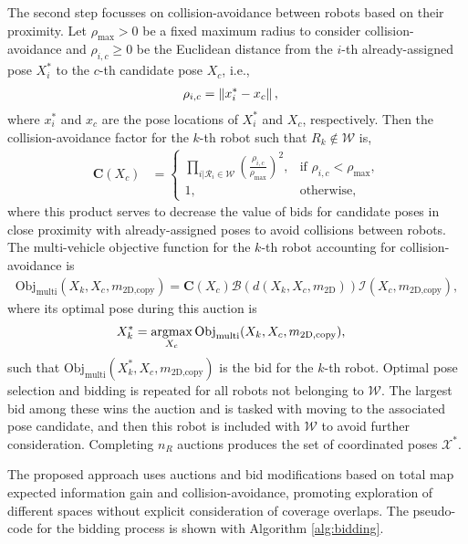 The second step focusses on collision-avoidance between robots based on their proximity. Let $\rho_\text{max}>0$ be a fixed maximum radius to consider collision-avoidance and $\rho_{i,c}\geq0$ be the Euclidean distance from the $i$-th already-assigned pose $X^*_i$ to the $c$-th candidate pose $X_c$, i.e.,
\begin{align}
\rho_{i,c}&=\left\| x^*_i-x_c \right\|,
\end{align}
where $x^*_i$ and $x_c$ are the pose locations of $X^*_i$ and $X_c$, respectively. Then the collision-avoidance factor for the $k$-th robot such that $R_k\notin\mathcal W$ is,
\begin{align}
\label{eqn:CollisionAvoidanceAmongRobots}
\mathbf C(X_c)&=
\begin{cases}
    \prod_{i|\mathcal{R}_i\in\mathcal W} \left(\frac{\rho_{i,c}}{\rho_\text{max}}\right)^2,		& \text{if }\rho_{i,c}<\rho_\text{max},\\
    1,              				& \text{otherwise},
\end{cases}
\end{align}
where this product serves to decrease the value of bids for candidate poses in close proximity with already-assigned poses to avoid collisions between robots. The multi-vehicle objective function for the $k$-th robot accounting for collision-avoidance is
\begin{align}
\label{eqn:CandidateBidMulti}
\text{Obj}_\text{multi}(X_k,X_c,m_\text{2D,copy})
=\mathbf C(X_c)\mathcal B(d(X_k,X_c,m_\text{2D}))\mathcal I(X_{c},m_\text{2D,copy}),
\end{align}
where its optimal pose during this auction is
\begin{align}
\label{eqn:OptPoseMulti}
X^*_{k}=\argmax_{X_c}\text{Obj}_\text{multi}&(X_k,X_c,m_\text{2D,copy}),
\end{align}
such that $\text{Obj}_\text{multi}(X^*_k,X_c,m_\text{2D,copy})$ is the bid for the $k$-th robot.
Optimal pose selection and bidding is repeated for all robots not belonging to $\mathcal W$. The largest bid among these wins the auction and is tasked with moving to the associated pose candidate, and then this robot is included with $\mathcal W$ to avoid further consideration. Completing $n_R$ auctions produces the set of coordinated poses $\mathcal X^*$.

The proposed approach uses auctions and bid modifications based on total map expected information gain and collision-avoidance, promoting exploration of different spaces without explicit consideration of coverage overlaps. The pseudo-code for the bidding process is shown with Algorithm \ref{alg:bidding}.

